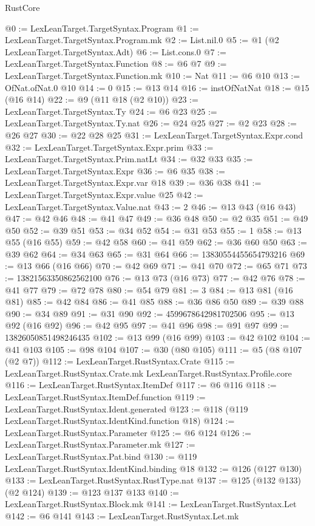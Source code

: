 \begin{lexlean}{RustCore}
\begin{coremodule}
@0 := LexLeanTarget.TargetSyntax.Program
@1 := LexLeanTarget.TargetSyntax.Program.mk
@2 := List.nil.{0}
@5 := @1 (@2 LexLeanTarget.TargetSyntax.Adt)
@6 := List.cons.{0}
@7 := LexLeanTarget.TargetSyntax.Function
@8 := @6 @7
@9 := LexLeanTarget.TargetSyntax.Function.mk
@10 := Nat
@11 := @6 @10
@13 := OfNat.ofNat.{0} @10
@14 := 0
@15 := @13 @14
@16 := instOfNatNat
@18 := @15 (@16 @14)
@22 := @9 (@11 @18 (@2 @10))
@23 := LexLeanTarget.TargetSyntax.Ty
@24 := @6 @23
@25 := LexLeanTarget.TargetSyntax.Ty.nat
@26 := @24 @25
@27 := @2 @23
@28 := @26 @27
@30 := @22 @28 @25
@31 := LexLeanTarget.TargetSyntax.Expr.cond
@32 := LexLeanTarget.TargetSyntax.Expr.prim
@33 := LexLeanTarget.TargetSyntax.Prim.natLt
@34 := @32 @33
@35 := LexLeanTarget.TargetSyntax.Expr
@36 := @6 @35
@38 := LexLeanTarget.TargetSyntax.Expr.var @18
@39 := @36 @38
@41 := LexLeanTarget.TargetSyntax.Expr.value @25
@42 := LexLeanTarget.TargetSyntax.Value.nat
@43 := 2
@46 := @13 @43 (@16 @43)
@47 := @42 @46
@48 := @41 @47
@49 := @36 @48
@50 := @2 @35
@51 := @49 @50
@52 := @39 @51
@53 := @34 @52
@54 := @31 @53
@55 := 1
@58 := @13 @55 (@16 @55)
@59 := @42 @58
@60 := @41 @59
@62 := @36 @60 @50
@63 := @39 @62
@64 := @34 @63
@65 := @31 @64
@66 := 13830554455654793216
@69 := @13 @66 (@16 @66)
@70 := @42 @69
@71 := @41 @70
@72 := @65 @71
@73 := 13821563350862562100
@76 := @13 @73 (@16 @73)
@77 := @42 @76
@78 := @41 @77
@79 := @72 @78
@80 := @54 @79
@81 := 3
@84 := @13 @81 (@16 @81)
@85 := @42 @84
@86 := @41 @85
@88 := @36 @86 @50
@89 := @39 @88
@90 := @34 @89
@91 := @31 @90
@92 := 4599678642981702506
@95 := @13 @92 (@16 @92)
@96 := @42 @95
@97 := @41 @96
@98 := @91 @97
@99 := 13826050851498246435
@102 := @13 @99 (@16 @99)
@103 := @42 @102
@104 := @41 @103
@105 := @98 @104
@107 := @30 (@80 @105)
@111 := @5 (@8 @107 (@2 @7))
@112 := LexLeanTarget.RustSyntax.Crate
@115 := LexLeanTarget.RustSyntax.Crate.mk LexLeanTarget.RustSyntax.Profile.core
@116 := LexLeanTarget.RustSyntax.ItemDef
@117 := @6 @116
@118 := LexLeanTarget.RustSyntax.ItemDef.function
@119 := LexLeanTarget.RustSyntax.Ident.generated
@123 := @118 (@119 LexLeanTarget.RustSyntax.IdentKind.function @18)
@124 := LexLeanTarget.RustSyntax.Parameter
@125 := @6 @124
@126 := LexLeanTarget.RustSyntax.Parameter.mk
@127 := LexLeanTarget.RustSyntax.Pat.bind
@130 := @119 LexLeanTarget.RustSyntax.IdentKind.binding @18
@132 := @126 (@127 @130)
@133 := LexLeanTarget.RustSyntax.RustType.nat
@137 := @125 (@132 @133) (@2 @124)
@139 := @123 @137 @133
@140 := LexLeanTarget.RustSyntax.Block.mk
@141 := LexLeanTarget.RustSyntax.Let
@142 := @6 @141
@143 := LexLeanTarget.RustSyntax.Let.mk

\end{coremodule}
\end{lexlean}
